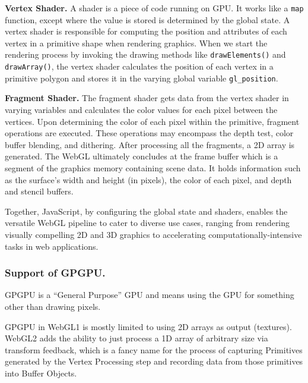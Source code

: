 \textbf{Vertex Shader.} A shader is a piece of code running on GPU. It works like a \texttt{map} function, except where the value is stored is determined by the global state. A vertex shader is responsible for computing the position and attributes of each vertex in a primitive shape when rendering graphics. When we start the rendering process by invoking the drawing methods like \texttt{drawElements()} and \texttt{drawArray()}, the vertex shader calculates the position of each vertex in a primitive polygon and stores it in the varying global variable \texttt{gl\_position}.  


\textbf{Fragment Shader.} The fragment shader gets data from the vertex shader in varying variables and calculates the color values for each pixel between the vertices. Upon determining the color of each pixel within the primitive, fragment operations are executed. These operations may encompass the depth test, color buffer blending, and dithering. After processing all the fragments, a 2D array is generated. The WebGL ultimately concludes at the frame buffer which is a segment of the graphics memory containing scene data. It holds information such as the surface’s width and height (in pixels), the color of each pixel, and depth and stencil buffers.

Together, JavaScript, by configuring the global state and shaders, enables the versatile WebGL pipeline to cater to diverse use cases, ranging from rendering visually compelling 2D and 3D graphics to accelerating computationally-intensive tasks in web applications.


\subsubsection{Support of GPGPU.}

GPGPU is a ``General Purpose'' GPU and means using the GPU for something other than drawing pixels.

GPGPU in WebGL1 is mostly limited to using 2D arrays as output (textures). WebGL2 adds the ability to just process a 1D array of arbitrary size via transform feedback, which is a fancy name for the process of capturing Primitives generated by the Vertex Processing step and recording data from those primitives into Buffer Objects.

